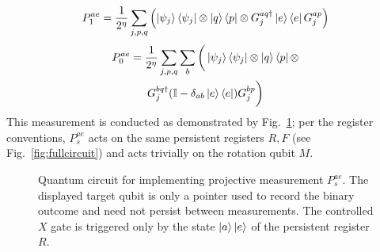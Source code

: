 \documentclass[aps,floatfix,10pt,amssymb,amsfont,amsmath,superscriptaddress,float,nofootinbib,longbibliography,nobalancelastpage,twocolumn]{revtex4-2}
\begin{document}
\begin{equation}
    P^{ae}_1 = \frac{1}{2^{\eta}}\sum_{j,p,q} \left( \ket{\psi_j}\bra{\psi_j} \otimes \ket{q}\bra{p} \otimes G_j^{aq\dagger}\ket{e}\bra{e}G_j^{ap} \right)
\end{equation}
\begin{multline}
    P^{ae}_0 = \frac{1}{2^{\eta}}\sum_{j,p,q} \sum_{b}\bigg( \ket{\psi_j}\bra{\psi_j} \otimes \ket{q}\bra{p} \otimes \\G_j^{bq\dagger}(\mathbb{I} - \delta_{ab}\ket{e}\bra{e})G_j^{bp}  \bigg)
\end{multline}
This measurement is conducted as demonstrated by Fig.~\ref{fig:Pcircuit}; per the register conventions, $P_s^{ae}$ acts on the same persistent registers $R, F$ (see Fig.~\ref{fig:fullcircuit}) and acts trivially on the rotation qubit $M$.
\begin{figure}

\caption{Quantum circuit for implementing projective measurement $P_s^{ae}$. The displayed target qubit is only a pointer used to record the binary outcome and need not persist between measurements. The controlled $X$ gate is triggered only by the state $\ket{a}\ket{e}$ of the persistent register $R$.}
\label{fig:Pcircuit}
\end{figure}
\end{document}
